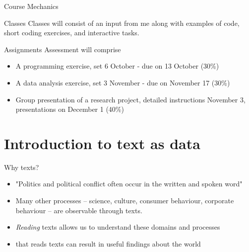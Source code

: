 \documentclass[
  10pt,
  ignorenonframetext,
  aspectratio=169]{beamer}
\providecommand{\tightlist}{%
  \setlength{\itemsep}{0pt}\setlength{\parskip}{0pt}}
\begin{document}
\begin{frame}{Course Mechanics}
\protect\hypertarget{course-mechanics}{}
\begin{block}{Classes}
\protect\hypertarget{classes}{}
Classes will consist of an input from me along with examples of code,
short coding exercises, and interactive tasks.
\end{block}

\begin{block}{Assignments}
\protect\hypertarget{assignments}{}
Assessment will comprise

\begin{itemize}
\tightlist
\item
  A programming exercise, set 6 October - due on 13 October (30\%)
\item
  A data analysis exercise, set 3 November - due on November 17 (30\%)
\item
  Group presentation of a research project, detailed instructions
  November 3, presentations on December 1 (40\%)
\end{itemize}
\end{block}
\end{frame}

\hypertarget{introduction-to-text-as-data}{%
\section{Introduction to text as
data}\label{introduction-to-text-as-data}}

\begin{frame}{Why texts?}
\protect\hypertarget{why-texts}{}
\begin{itemize}
  \item<1-> "Politics and political conflict often occur in the written and spoken word" \citep{grimmer_text_2013}
  \item<2-> Many other processes -- science, culture, consumer behaviour, corporate behaviour --  are observable through texts. 
  \item<3-> \textit{Reading} texts allows us to understand these domains and processes
  \item<4->  that reads texts can result in useful findings about the world
\end{itemize}

\end{frame}
\end{document}
